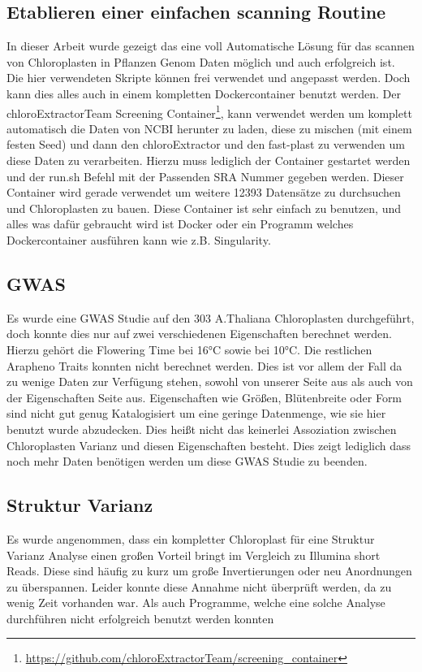 \documentclass{scrartcl}
\begin{document}
\subsection{Etablieren einer einfachen scanning Routine}
\label{sec-5-5}
In dieser Arbeit wurde gezeigt das eine voll Automatische Lösung für das scannen von Chloroplasten in Pflanzen Genom Daten möglich und auch erfolgreich ist. Die hier verwendeten Skripte können frei verwendet und angepasst werden. 
Doch kann dies alles auch in einem kompletten Dockercontainer benutzt werden. Der chloroExtractorTeam Screening Container\footnote{\url{https://github.com/chloroExtractorTeam/screening_container}}, kann verwendet werden um komplett automatisch die Daten von NCBI herunter zu laden, diese zu mischen
(mit einem festen Seed) und dann den chloroExtractor und den fast-plast zu verwenden um diese Daten zu verarbeiten. Hierzu muss lediglich der Container gestartet werden und der run.sh Befehl mit der Passenden SRA Nummer gegeben 
werden. Dieser Container wird gerade verwendet um weitere 12393 Datensätze zu durchsuchen und Chloroplasten zu bauen. Diese Container ist sehr einfach zu benutzen, und alles was dafür gebraucht wird ist Docker\footnotemark[40]{} oder ein Programm
welches Dockercontainer ausführen kann wie z.B. Singularity\footnotemark[49]{}. 
\subsection{GWAS}
\label{sec-5-6}
Es wurde eine GWAS Studie auf den 303 A.Thaliana Chloroplasten durchgeführt, doch konnte dies nur auf zwei verschiedenen Eigenschaften berechnet werden. Hierzu gehört die Flowering Time bei 16°C sowie bei 10°C. 
Die restlichen Arapheno Traits konnten nicht berechnet werden. Dies ist vor allem der Fall da zu wenige Daten zur Verfügung stehen, sowohl von unserer Seite aus als auch von der Eigenschaften Seite aus. Eigenschaften wie
Größen, Blütenbreite oder Form sind nicht gut genug Katalogisiert um eine geringe Datenmenge, wie sie hier benutzt wurde abzudecken. Dies heißt nicht das keinerlei Assoziation zwischen Chloroplasten Varianz und diesen Eigenschaften besteht.
Dies zeigt lediglich dass noch mehr Daten benötigen werden um diese GWAS Studie zu beenden‌.
\subsection{Struktur Varianz}
\label{sec-5-7}
Es wurde angenommen, dass ein kompletter Chloroplast für eine Struktur Varianz Analyse einen großen Vorteil bringt im Vergleich zu Illumina short Reads. Diese sind häufig zu kurz um große Invertierungen oder neu Anordnungen zu 
überspannen. Leider konnte diese Annahme nicht überprüft werden, da zu wenig Zeit vorhanden war. Als auch Programme, welche eine solche Analyse durchführen nicht erfolgreich benutzt werden konnten 
\end{document}
